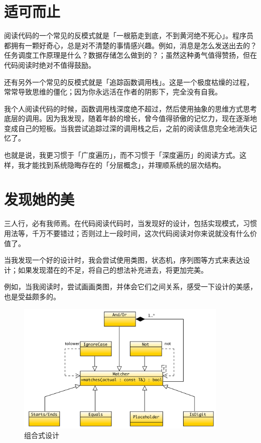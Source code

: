 \section{适可而止}

\begin{content}

阅读代码的一个常见的反模式就是「一根筋走到底，不到黄河绝不死心」。程序员都拥有一颗好奇心，总是对不清楚的事情感兴趣。例如，消息是怎么发送出去的？任务调度工作原理是什么？数据存储怎么做到的？；虽然这种勇气值得赞扬，但在代码阅读时绝对不值得鼓励。

还有另外一个常见的反模式就是「追踪函数调用栈」。这是一个极度枯燥的过程，常常导致思维的僵化；因为你永远活在作者的阴影下，完全没有自我。

我个人阅读代码的时候，函数调用栈深度绝不超过，然后使用抽象的思维方式思考底层的调用。因为我发现，随着年龄的增长，曾今值得骄傲的记忆力，现在逐渐地变成自己的短板。当我尝试追踪过深的调用栈之后，之前的阅读信息完全地消失记忆了。

也就是说，我更习惯于「广度遍历」，而不习惯于「深度遍历」的阅读方式。这样，我才能找到系统隐晦存在的「分层概念」，并理顺系统的层次结构。

\end{content}

\section{发现她的美}

\begin{content}

三人行，必有我师焉。在代码阅读代码时，当发现好的设计，包括实现模式，习惯用法等，千万不要错过；否则过上一段时间，这次代码阅读对你来说就没有什么价值了。

当我发现一个好的设计时，我会尝试使用类图，状态机，序列图等方式来表达设计；如果发现潜在的不足，将自己的想法补充进去，将更加完美。

例如，当我阅读时，尝试画画类图，并体会它们之间关系，感受一下设计的美感，也是受益颇多的。

\begin{figure}[!h]
\centering
\includegraphics[width=0.9\textwidth]{figures/hamcrest.png}
\caption{组合式设计}
 \label{fig:hamcrest}
\end{figure}

\end{content}


